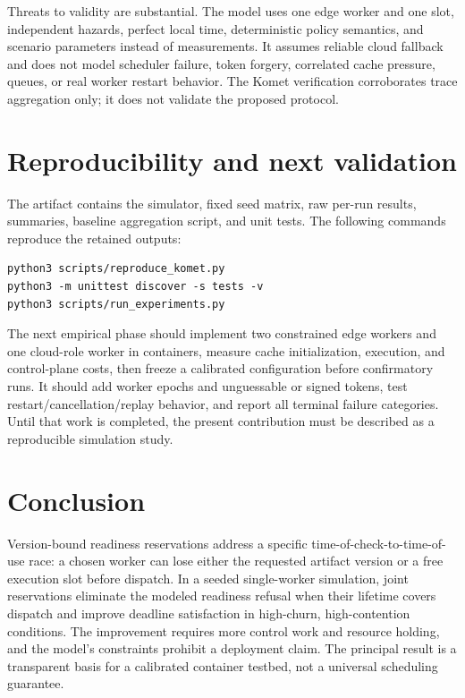\documentclass[11pt,a4paper]{article}
\begin{document}
Threats to validity are substantial. The model uses one edge worker and one slot, independent hazards, perfect local time, deterministic policy semantics, and scenario parameters instead of measurements. It assumes reliable cloud fallback and does not model scheduler failure, token forgery, correlated cache pressure, queues, or real worker restart behavior. The Komet verification corroborates trace aggregation only; it does not validate the proposed protocol.

\section{Reproducibility and next validation}

The artifact contains the simulator, fixed seed matrix, raw per-run results, summaries, baseline aggregation script, and unit tests. The following commands reproduce the retained outputs:

\begin{verbatim}
python3 scripts/reproduce_komet.py
python3 -m unittest discover -s tests -v
python3 scripts/run_experiments.py
\end{verbatim}

The next empirical phase should implement two constrained edge workers and one cloud-role worker in containers, measure cache initialization, execution, and control-plane costs, then freeze a calibrated configuration before confirmatory runs. It should add worker epochs and unguessable or signed tokens, test restart/cancellation/replay behavior, and report all terminal failure categories. Until that work is completed, the present contribution must be described as a reproducible simulation study.

\section{Conclusion}

Version-bound readiness reservations address a specific time-of-check-to-time-of-use race: a chosen worker can lose either the requested artifact version or a free execution slot before dispatch. In a seeded single-worker simulation, joint reservations eliminate the modeled readiness refusal when their lifetime covers dispatch and improve deadline satisfaction in high-churn, high-contention conditions. The improvement requires more control work and resource holding, and the model's constraints prohibit a deployment claim. The principal result is a transparent basis for a calibrated container testbed, not a universal scheduling guarantee.
\end{document}
